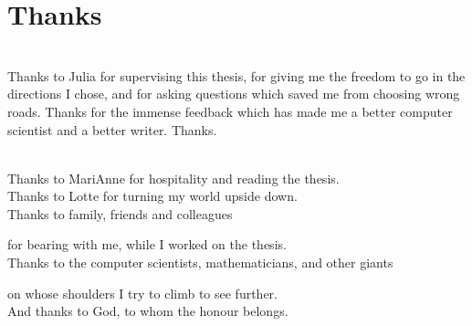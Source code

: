 \chapter{Thanks}
\mbox{}\\
Thanks to Julia for supervising this thesis, for giving me the freedom to go in the directions I chose, and for asking questions which saved me from choosing wrong roads. 
Thanks for the immense feedback which has made me a better computer scientist and a better writer. Thanks.


\mbox{}\\
Thanks to MariAnne for hospitality and reading the thesis.\\
Thanks to Lotte for turning my world upside down.\\
Thanks to family, friends and colleagues 

for bearing with me, while I worked on the thesis.\\
Thanks to the computer scientists, mathematicians, and other giants

on whose shoulders I try to climb to see further.\\
And thanks to God, to whom the honour belongs. 
